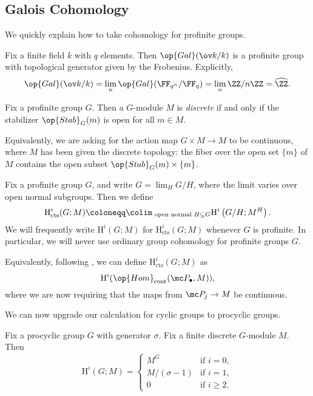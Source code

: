 \documentclass[../notes.tex]{subfiles}
\begin{document}
\subsection{Galois Cohomology}
We quickly explain how to take cohomology for profinite groups.
\begin{example}
	Fix a finite field $k$ with $q$ elements. Then $\op{Gal}(\ov k/k)$ is a profinite group with topological generator given by the Frobenius. Explicitly,
	\[\op{Gal}(\ov k/k)=\lim_n\op{Gal}(\FF_{q^n}/\FF_q)=\lim_n\ZZ/n\ZZ=\widehat\ZZ.\]
\end{example}
\begin{definition}[discrete]
	Fix a profinite group $G$. Then a $G$-module $M$ is \textit{discrete} if and only if the stabilizer $\op{Stab}_G(m)$ is open for all $m\in M$.
\end{definition}
\begin{remark}
	Equivalently, we are asking for the action map $G\times M\to M$ to be continuous, where $M$ has been given the discrete topology: the fiber over the open set $\{m\}$ of $M$ contains the open subset $\op{Stab}_G(m)\times\{m\}$.
\end{remark}
\begin{definition}
	Fix a profinite group $G$, and write $G=\lim_H G/H$, where the limit varies over open normal subgroups. Then we define
	\[\mathrm H^i_{\mathrm{cts}}(G;M)\coloneqq\colim_{\text{ open normal }H\subseteq G}\mathrm H^i\left(G/H;M^H\right).\]
	We will frequently write $\mathrm H^i(G;M)$ for $\mathrm H^i_{\mathrm{cts}}(G;M)$ whenever $G$ is profinite. In particular, we will never use ordinary group cohomology for profinite groups $G$.
\end{definition}
\begin{remark}
	Equivalently, following , we can define $\mathrm H^i_{\mathrm{cts}}(G;M)$ as
	\[\mathrm H^i(\op{Hom}_{\mathrm{cont}}(\mc P_\bullet,M)),\]
	where we are now requiring that the maps from $\mc P_j\to M$ be continuous.
\end{remark}
We can now upgrade our calculation for cyclic groups to procyclic groups.
\begin{proposition} \label{prop:procyclic-cohom}
	Fix a procyclic group $G$ with generator $\sigma$. Fix a finite discrete $G$-module $M$. Then
	\[\mathrm H^i\left(G;M\right) = \begin{cases}
		M^{G} & \text{if }i=0, \\
		M/(\sigma-1) & \text{if }i=1, \\
		0 & \text{if }i\ge2.
	\end{cases}\]
\end{proposition}
\end{document}
